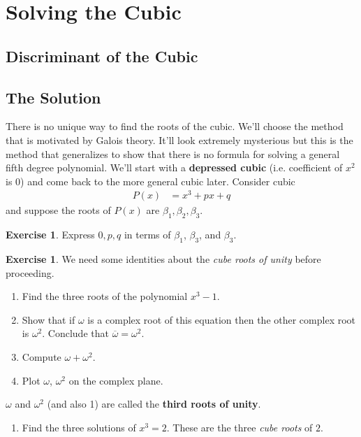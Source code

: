 \documentclass[reqno, 12pt, letter]{article}
\theoremstyle{plain}
\theoremstyle{definition}
\newtheorem{exercise}[theorem]{Exercise}
\theoremstyle{remark}
\numberwithin{equation}{section}
\begin{document}
\newpage
\section{Solving the Cubic}

	
	
	
	
	
	\subsection{Discriminant of the Cubic}
	
	
	
	
	
	
	\subsection{The Solution}
		
		
	There is no unique way to find the roots of the cubic. 
	We'll choose the method that is motivated by Galois theory. 
	It'll look extremely mysterious but this is the method that generalizes to show that there is no formula for solving a general fifth degree polynomial. 
	We'll start with a \textbf{depressed cubic} (i.e. coefficient of $ x^2$ is 0) and come back to the more general cubic later. Consider cubic
		\begin{align*}
			P(x) &= x^3 + px + q
		\end{align*}
	and suppose the roots of $ P(x)$ are $ \beta_1, \beta_2, \beta_3$.
	
	\begin{exercise}
	\label{exercise:coefficients_depressed_cubic}
		Express $ 0,p,q$ in terms of $ \beta_1$, $ \beta_3$, and $ \beta_3$.
	\end{exercise}

	\begin{exercise}
	We need some identities about the \emph{cube roots of unity} before proceeding.
	\begin{enumerate}
		\item Find the three roots of the polynomial $ x^3 - 1$.
		\item Show that if $ \omega $ is a complex root of this equation then the other complex root is $ \omega^2$. Conclude that $ \overline{\omega} = \omega^2$.
    \item Compute $ \omega + \omega^2$.
		\item Plot $ \omega$, $\omega^2$ on the complex plane.
	\end{enumerate}
  $ \omega$ and $ \omega^2$ (and also 1) are called the \textbf{third roots of unity}.
	\begin{enumerate}[resume]
		\item Find the three solutions of $ x^3 = 2$. These are the three \emph{cube roots} of $ 2$.
	\end{enumerate}
\end{exercise}
\end{document}
